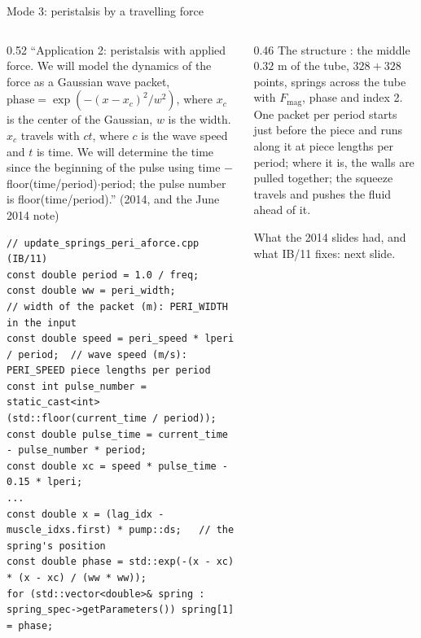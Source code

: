 \documentclass[aspectratio=169,11pt]{beamer}
\begin{document}
\begin{frame}[fragile]{Mode 3: peristalsis by a travelling force}
\label{fr:forceperi}
\begin{columns}[T,onlytextwidth]
\begin{column}{0.52\textwidth}
\footnotesize ``Application 2: peristalsis with applied force. We will model the dynamics of the force as a Gaussian wave packet, $\mathrm{phase} = \exp(-(x - x_c)^2/w^2)$, where $x_c$ is the center of the Gaussian, $w$ is the width. $x_c$ travels with $ct$, where $c$ is the wave speed and $t$ is time. We will determine the time since the beginning of the pulse using time $-$ floor(time/period)$\cdot$period; the pulse number is floor(time/period).'' (2014, and the June 2014 note)
\begin{lstlisting}[style=cpptiny]
// update_springs_peri_aforce.cpp (IB/11)
const double period = 1.0 / freq;
const double ww = peri_width;                      // width of the packet (m): PERI_WIDTH in the input
const double speed = peri_speed * lperi / period;  // wave speed (m/s): PERI_SPEED piece lengths per period
const int pulse_number = static_cast<int>(std::floor(current_time / period));
const double pulse_time = current_time - pulse_number * period;
const double xc = speed * pulse_time - 0.15 * lperi;
...
const double x = (lag_idx - muscle_idxs.first) * pump::ds;   // the spring's position
const double phase = std::exp(-(x - xc) * (x - xc) / (ww * ww));
for (std::vector<double>& spring : spring_spec->getParameters()) spring[1] = phase;
\end{lstlisting}
\end{column}
\begin{column}{0.46\textwidth}
\scriptsize The structure : the middle $0.32$ m of the tube, $328 + 328$ points, springs across the tube with $F_{\mathrm{mag}}$, phase and index 2. One packet per period starts just before the piece and runs along it at  piece lengths per period; where it is, the walls are pulled together; the squeeze travels and pushes the fluid ahead of it.
\vspace{1mm}

\scriptsize What the 2014 slides had, and what IB/11 fixes: next slide.
\end{column}
\end{columns}
\end{frame}
\end{document}
